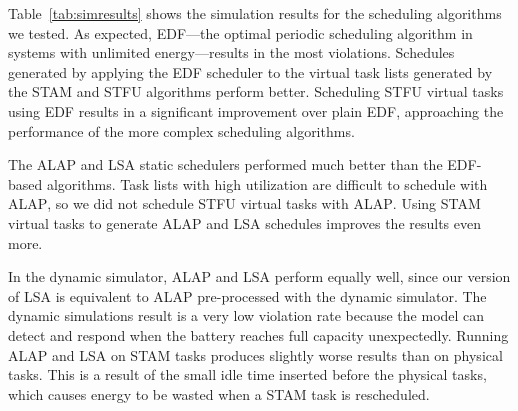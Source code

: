 Table~\ref{tab:simresults} shows the simulation results for the scheduling algorithms we tested.  As expected, \textsc{EDF}---the optimal periodic scheduling algorithm in systems with unlimited energy---results in the most violations.  Schedules generated by applying the \textsc{EDF} scheduler to the virtual task lists generated by the \textsc{STAM} and \textsc{STFU} algorithms perform better.  Scheduling \textsc{STFU} virtual tasks using \textsc{EDF} results in a significant improvement over plain \textsc{EDF}, approaching the performance of the more complex scheduling algorithms.

The \textsc{ALAP} and \textsc{LSA} static schedulers performed much better than the \textsc{EDF}-based algorithms.  Task lists with high utilization are difficult to schedule with \textsc{ALAP}, so we did not schedule \textsc{STFU} virtual tasks with \textsc{ALAP}.  Using \textsc{STAM} virtual tasks to generate \textsc{ALAP} and \textsc{LSA} schedules improves the results even more.

In the dynamic simulator, \textsc{ALAP} and \textsc{LSA} perform equally well, since our version of \textsc{LSA} is equivalent to \textsc{ALAP} pre-processed with the dynamic simulator.  The dynamic simulations result is a very low violation rate because the model can detect and respond when the battery reaches full capacity unexpectedly.  Running \textsc{ALAP} and \textsc{LSA} on \textsc{STAM} tasks produces slightly worse results than on physical tasks.  This is a result of the small idle time inserted before the physical tasks, which causes energy to be wasted when a \textsc{STAM} task is rescheduled.





































